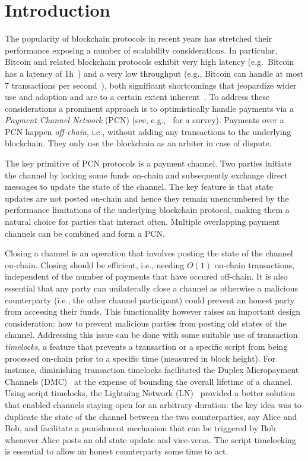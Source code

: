 \section{Introduction}
  The popularity of blockchain protocols in recent years has stretched their
  performance exposing a number of scalability considerations. In particular,
  Bitcoin and related blockchain protocols exhibit very high latency (e.g.\
  Bitcoin has a latency of 1h~\cite{bitcoin}) and a very low throughput (e.g.,
  Bitcoin can handle at most 7 transactions per second~\cite{scaling}), both
  significant shortcomings that jeopardize wider use and adoption and are to a
  certain extent inherent~\cite{scaling}. To address these considerations a
  prominent approach is to optimistically handle payments via a \emph{Payment
  Channel Network} (PCN) (see, e.g.,~\cite{DBLP:conf/fc/GudgeonMRMG20} for a
  survey). Payments over a PCN happen \emph{off-chain}, i.e., without adding any
  transactions to the underlying blockchain. They only use the blockchain as an
  arbiter in case of dispute.

The key primitive of PCN protocols is a payment channel. Two parties initiate
the channel by locking some funds on-chain and subsequently exchange direct
messages to update the state of the channel. The key feature is that state
updates are not posted on-chain and hence they remain unencumbered by the
performance limitations of the underlying blockchain protocol, making them a
natural choice for parties that interact often. Multiple overlapping payment
channels can be combined and form a PCN.

Closing a channel is an operation that involves posting the state of the channel
on-chain. Closing should be efficient, i.e., needing $O(1)$ on-chain
transactions, independent of the number of payments that have occured off-chain.
It is also essential that any party can unilaterally close a channel as
otherwise a malicious counterparty (i.e., the other channel participant) could
prevent an honest party from accessing their funds. This functionality however
raises an important design consideration: how to prevent malicious parties from
posting old states of the channel.
%
Addressing this issue can be done with some suitable use of transaction
\emph{timelocks}, a feature that prevents a transaction or a specific script from
being processed on-chain prior to a specific time (measured in block height).
%
For instance, diminishing transaction timelocks facilitated the Duplex
Micropayment Channels (DMC)~\cite{decker} at the expense of bounding the overall
lifetime of a channel. Using script timelocks, the Lightning Network
(LN)~\cite{lightning} provided a better solution that enabled channels staying
open for an arbitrary duration: the key idea was to duplicate the state of the
channel between the two counterparties, say Alice and Bob, and facilitate a
punishment mechanism that can be triggered by Bob whenever Alice posts an old
state update and vice-versa. The script timelocking is essential to allow an
honest counterparty some time to act.

